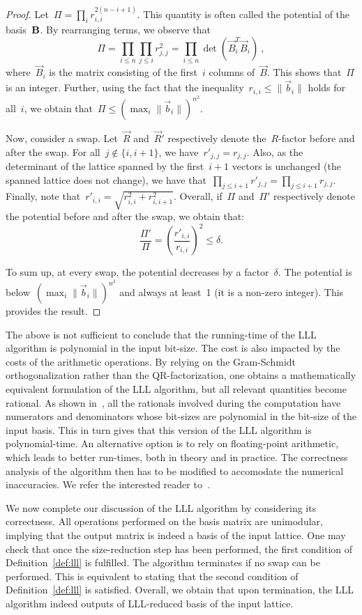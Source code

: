\begin{proof}
Let~$\Pi = \prod_i r_{i,i}^{2(n-i+1)}$. This quantity is often called the potential of the basis~$\bf{B}$. 
By rearranging terms, we observe that
\[
\Pi = \prod_{i\leq n} \prod_{j \leq i} r_{j,j}^2 =  \prod_{i\leq n} \det (\vec{B}_i^T \vec{B}_i) \ ,
\]
where~$\vec{B}_i$ is the matrix consisting of the first~$i$ columns of~$\vec{B}$. This shows that~$\Pi$ is an integer. 
Further, using the fact that the inequality~$r_{i,i} \leq \|\vec{b}_i\|$ holds for all~$i$, we obtain 
that~$\Pi \leq (\max_i \|\vec{b}_i\|)^{n^2}$. 

Now, consider a swap. Let~$\vec{R}$ and~$\vec{R}'$ respectively denote the~$R$-factor before and after the swap. 
For all~$j \notin \{i,i+1\}$, we have~$r'_{j,j} = r_{j,j}$. Also, as the determinant of the lattice spanned by the first~$i+1$ vectors is unchanged (the spanned lattice does not change), we have that~$\prod_{j \leq i+1} r'_{j,j} =  \prod_{j \leq i+1} r_{j,j}$. 
Finally, note that~$r'_{i,i} = \sqrt{r_{i,i}^2 + r_{i,i+1}^2}$. 
Overall, 
if~$\Pi$ and~$\Pi'$ respectively denote the potential before and after the swap, we obtain that:
\[ 
\frac{\Pi'}{\Pi} = \left( \frac{r'_{i,i}}{r_{i,i}}\right)^2  \leq \delta.  
\]

To sum up, at every swap, the potential decreases by a factor~$\delta$. The potential is below~$(\max_i \|\vec{b}_i\|)^{n^2}$ and always at least~1 (it is a non-zero integer). This provides the result. 
\end{proof}

The above is not sufficient to conclude that the running-time of the LLL algorithm is polynomial in the input bit-size. 
The cost is also impacted by the costs of the arithmetic operations. By relying on the Gram-Schmidt orthogonalization rather than the
QR-factorization, one obtains a mathematically equivalent formulation of the LLL algorithm, but all relevant quantities become rational. 
As shown in~\cite{LeLeLo82}, all the rationals involved during the computation have numerators and denominators whose bit-sizes 
are polynomial in the bit-size of the input basis. This in turn gives that this version of the LLL algorithm is polynomial-time. 
An alternative option is to rely on floating-point arithmetic, which leads to better run-times, both in theory and in practice. 
The correctness analysis of the algorithm then has to be modified to accomodate the numerical inaccuracies. We refer the interested reader to~\cite{NgSt09}. 
 
We now complete our discussion of the LLL algorithm by considering its correctness. 
All operations performed on the basis matrix are unimodular, implying that the output matrix is indeed a basis of the input lattice. 
One may check that once the size-reduction step has been performed, the first condition of Definition~\ref{def:lll} is fulfilled. 
The algorithm terminates if no swap can be performed. This is equivalent to stating that the second condition of Definition~\ref{def:lll} is satisfied. Overall, we obtain that upon termination, the LLL algorithm indeed outputs of LLL-reduced basis of the input lattice.



